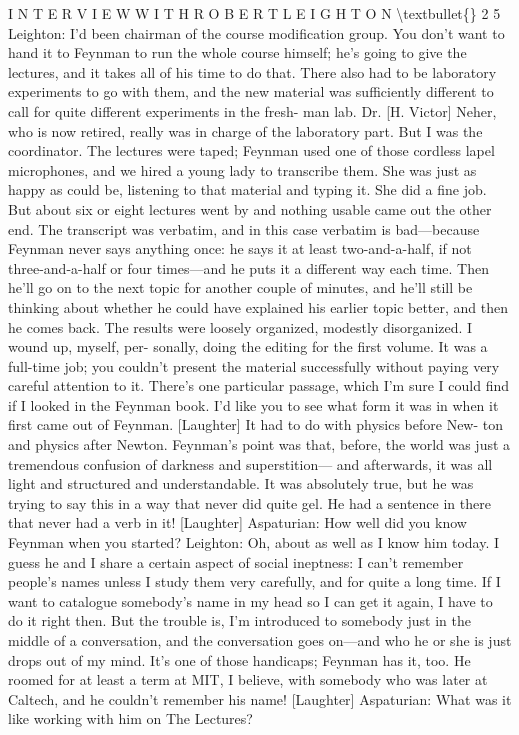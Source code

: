 \documentclass[10pt,oneside]{article}
\begin{document}
I N T E R V I E W  W I T H  R O B E R T  L E I G H T O N \textbackslash{}textbullet\{\} 2 5 Leighton: I’d been chairman of the course modification group. You don’t want to hand it to Feynman to run the whole course himself; he’s going to give the lectures, and it takes all of his time to do that. There also had to be laboratory experiments to go with them, and the new material was sufficiently different to call for quite different experiments in the fresh- man lab. Dr. [H. Victor] Neher, who is now retired, really was in charge of the laboratory part. But I was the coordinator. The lectures were taped; Feynman used one of those cordless lapel microphones, and we hired a young lady to transcribe them. She was just as happy as could be, listening to that material and typing it. She did a fine job. But about six or eight lectures went by and nothing usable came out the other end. The transcript was verbatim, and in this case verbatim is bad---because Feynman never says anything once: he says it at least two-and-a-half, if not three-and-a-half or four times---and he puts it a different way each time. Then he’ll go on to the next topic for another couple of minutes, and he’ll still be thinking about whether he could have explained his earlier topic better, and then he comes back. The results were loosely organized, modestly disorganized. I wound up, myself, per- sonally, doing the editing for the first volume. It was a full-time job; you couldn’t present the material successfully without paying very careful attention to it. There’s one particular passage, which I’m sure I could find if I looked in the Feynman book. I’d like you to see what form it was in when it first came out of Feynman. [Laughter] It had to do with physics before New- ton and physics after Newton. Feynman’s point was that, before, the world was just a tremendous confusion of darkness and superstition--- and afterwards, it was all light and structured and understandable. It was absolutely true, but he was trying to say this in a way that never did quite gel. He had a sentence in there that never had a verb in it! [Laughter] Aspaturian: How well did you know Feynman when you started? Leighton: Oh, about as well as I know him today. I guess he and I share a certain aspect of social ineptness: I can’t remember people’s names unless I study them very carefully, and for quite a long time. If I want to catalogue somebody’s name in my head so I can get it again, I have to do it right then. But the trouble is, I’m introduced to somebody just in the middle of a conversation, and the conversation goes on---and who he or she is just drops out of my mind. It’s one of those handicaps; Feynman has it, too. He roomed for at least a term at MIT, I believe, with somebody who was later at Caltech, and he couldn’t remember his name! [Laughter] Aspaturian: What was it like working with him on The Lectures?\par
\end{document}
